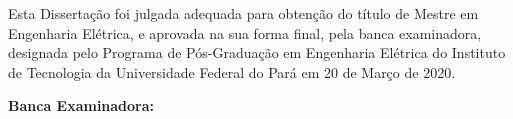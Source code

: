 %
% 
%
\begin{folhadeaprovacao}

    \begin{center}
        {\large\imprimirautor}

        \vspace*{\fill}\vspace*{\fill}
        \begin{center}
            {\ABNTEXchapterfont\Large\textbf{\imprimirtitulo}}
        \end{center}
        \vspace*{\fill}
    \end{center}    
    
    Esta Dissertação foi julgada adequada para obtenção do título de Mestre em Engenharia Elétrica, e aprovada na sua forma final, pela banca examinadora, designada pelo Programa de Pós-Graduação em Engenharia Elétrica do Instituto de Tecnologia da Universidade Federal do Pará em 20 de Março de 2020.
    
        
    
   \vspace*{0.5cm}
   \textbf{Banca Examinadora:}
   
    \setlength{\ABNTEXsignwidth}{9cm}
    


\end{folhadeaprovacao}
